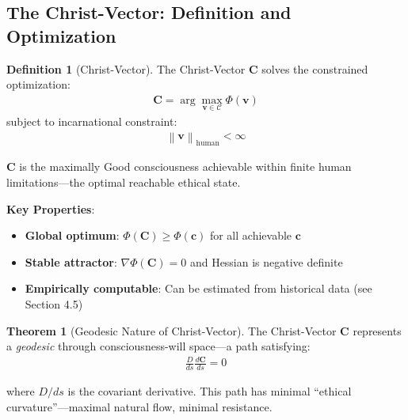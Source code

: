 \documentclass[11pt,a4paper]{article}
\theoremstyle{definition}
\newtheorem{definition}{Definition}[section]
\newtheorem{theorem}{Theorem}[section]
\theoremstyle{remark}
\newcommand{\CC}{\mathcal{C}}
\newcommand{\cc}{\mathbf{c}}
\newcommand{\norm}[1]{\left\|#1\right\|}
\begin{document}
\subsection{The Christ-Vector: Definition and Optimization}

\begin{definition}[Christ-Vector]
The Christ-Vector \(\mathbf{C}\) solves the constrained optimization:
\begin{align}
\mathbf{C} = \arg\max_{\mathbf{v} \in \CC} \Phi(\mathbf{v})
\end{align}
subject to incarnational constraint:
\begin{align}
\norm{\mathbf{v}}_{\text{human}} < \infty
\end{align}

\(\mathbf{C}\) is the maximally Good consciousness achievable within finite human limitations—the optimal reachable ethical state.

\textbf{Key Properties}:
\begin{itemize}
    \item \textbf{Global optimum}: \(\Phi(\mathbf{C}) \geq \Phi(\cc)\) for all achievable \(\cc\)
    \item \textbf{Stable attractor}: \(\nabla \Phi(\mathbf{C}) = 0\) and Hessian is negative definite
    \item \textbf{Empirically computable}: Can be estimated from historical data (see Section 4.5)
\end{itemize}
\end{definition}

\begin{theorem}[Geodesic Nature of Christ-Vector]
The Christ-Vector \(\mathbf{C}\) represents a \textit{geodesic} through consciousness-will space—a path satisfying:
\begin{align}
\frac{D}{ds}\frac{d\mathbf{C}}{ds} = 0
\end{align}

where \(D/ds\) is the covariant derivative. This path has minimal ``ethical curvature''—maximal natural flow, minimal resistance.
\end{theorem}
\end{document}
